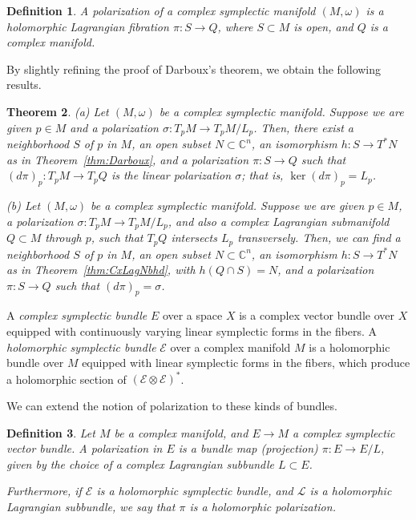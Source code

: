 \documentclass [11pt]{amsart}
\newtheorem {theorem}{Theorem}[section]
\newtheorem {definition}[theorem]{Definition}
\theoremstyle{remark}
\def\cc {{\mathbb{C}}}
\def\C{\cc}
\def\E{\mathcal{E}}
\def\L{\mathcal{L}}
\begin{document}
\begin{definition}
\label{def:polM}
A {\em polarization} of a complex symplectic manifold $(M, \omega)$ is a holomorphic Lagrangian fibration $\pi: S \to Q$, where $S \subset M$ is open, and $Q$ is a complex manifold.
\end{definition}

By slightly refining the proof of Darboux's theorem, we obtain the following results.
\begin{theorem}
\label{thm:pol1}
(a) Let $(M, \omega)$ be a complex symplectic manifold. Suppose we are given $p \in M$ and a polarization $\sigma: T_pM \to T_pM/L_p$. Then,  there exist a neighborhood $S$ of $p$ in $M$, an open subset $N \subset \C^n$, an isomorphism $h: S \to T^*N$ as in Theorem~\ref{thm:Darboux}, and a polarization $\pi: S \to Q$ such that $(d\pi)_p: T_pM \to T_pQ$ is the linear polarization $\sigma$; that is, $\ker(d\pi)_p=L_p$.

(b) Let $(M, \omega)$ be a complex symplectic manifold. Suppose we are given $p \in M$, a polarization $\sigma: T_pM \to T_pM/L_p$, and also a complex Lagrangian submanifold $Q \subset M$ through $p$, such that $T_pQ$ intersects $L_p$ transversely. Then, we can find a neighborhood $S$ of $p$ in $M$, an open subset $N \subset \C^n$, an isomorphism $h: S \to T^*N$ as in Theorem~\ref{thm:CxLagNbhd}, with $h(Q\cap S) = N$, and a polarization $\pi: S \to Q$ such that $(d\pi)_p=\sigma$.
\end{theorem}

A {\em complex symplectic bundle} $E$ over a space $X$ is a complex vector bundle over $X$ equipped with continuously varying linear symplectic forms in the fibers. A {\em holomorphic symplectic bundle} $\E$ over a complex manifold $M$ is a holomorphic bundle over $M$ equipped with linear symplectic forms in the fibers, which produce a holomorphic section of $(\E \otimes \E)^*$. 

We can extend the notion of polarization to these kinds of bundles. 

\begin{definition}
Let $M$ be a complex manifold, and $E \to M$ a complex symplectic vector bundle.
A {\em polarization} in $E$ is a bundle map (projection) $\pi: E \to E/L$, given by the choice of a complex Lagrangian subbundle $L \subset E$.

Furthermore, if $\E$ is a holomorphic symplectic bundle, and $\L$ is a holomorphic Lagrangian subbundle, we say that $\pi$ is a {\em holomorphic polarization}.
\end{definition}
\end{document}
